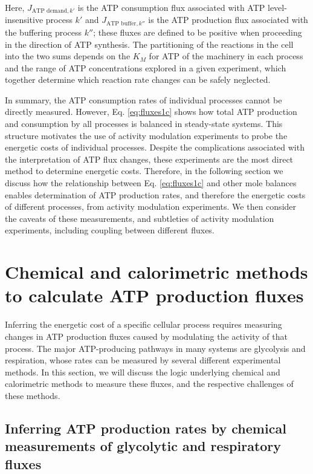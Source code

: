 \documentclass{compactarticle}
\begin{document}
Here, $ J_{\text{ATP demand},k'} $ is the ATP consumption flux associated with ATP level-insensitive process $ k'$ and $ J_{\text{ATP buffer},k''} $ is the ATP production flux associated with the buffering process $ k'' $; these fluxes are defined to be positive when proceeding in the direction of ATP synthesis. The partitioning of the reactions in the cell into the two sums depends on the $ K_M $ for ATP of the machinery in each process and the range of ATP concentrations explored in a given experiment, which together determine which reaction rate changes can be safely neglected.

In summary, the ATP consumption rates of individual processes cannot be directly measured. However, Eq. \ref{eq:fluxes1c} shows how total ATP production and consumption by all processes is balanced in steady-state systems. This structure motivates the use of activity modulation experiments to probe the energetic costs of individual processes. Despite the complications associated with the interpretation of ATP flux changes, these experiments are the most direct method to determine energetic costs. Therefore, in the following section we discuss how the relationship between Eq. \ref{eq:fluxes1c} and other mole balances enables determination of ATP production rates, and therefore the energetic costs of different processes, from activity modulation experiments. We then consider the caveats of these measurements, and subtleties of activity modulation experiments, including coupling between different fluxes.

\section{Chemical and calorimetric methods to calculate ATP production fluxes}

Inferring the energetic cost of a specific cellular process requires measuring changes in ATP production fluxes caused by modulating the activity of that process. The major ATP-producing pathways in many systems are glycolysis and respiration, whose rates can be measured by several different experimental methods. In this section, we will discuss the logic underlying chemical and calorimetric methods to measure these fluxes, and the respective challenges of these methods.

\subsection{Inferring ATP production rates by chemical measurements of glycolytic and respiratory fluxes}
\label{sec:glycresp}
\end{document}
